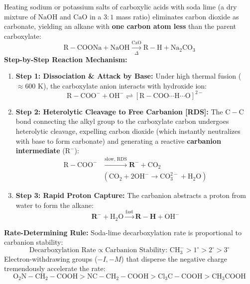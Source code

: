 \documentclass[10pt,twoside,openright]{book}
\begin{document}
\begin{conceptbox}
Heating sodium or potassium salts of carboxylic acids with soda lime (a dry mixture of $\mathrm{NaOH}$ and $\mathrm{CaO}$ in a $3:1$ mass ratio) eliminates carbon dioxide as carbonate, yielding an alkane with \textbf{one carbon atom less} than the parent carboxylate:
\begin{equation}
  \mathrm{R-COONa} + \mathrm{NaOH} \xrightarrow[\Delta]{\mathrm{CaO}} \mathrm{R-H} + \mathrm{Na_2CO_3}
\end{equation}
\textbf{Step-by-Step Reaction Mechanism:}
\begin{enumerate}[leftmargin=*]
  \item \textbf{Step 1: Dissociation \& Attack by Base:}
  Under high thermal fusion ($\approx 600\text{ K}$), the carboxylate anion interacts with hydroxide ion:
  \begin{equation}
    \mathrm{R-COO^-} + \mathrm{OH^-} \rightleftharpoons [\mathrm{R-COO\cdots H\cdots O}]^{2-}
  \end{equation}
  \item \textbf{Step 2: Heterolytic Cleavage to Free Carbanion [RDS]:}
  The $\mathrm{C-C}$ bond connecting the alkyl group to the carboxylate carbon undergoes heterolytic cleavage, expelling carbon dioxide (which instantly neutralizes with base to form carbonate) and generating a reactive \textbf{carbanion intermediate} ($\mathrm{R^-}$):
  \begin{align*}
    \mathrm{R-COO^-} &\xrightarrow{\text{slow, RDS}} \mathbf{R^-} + \mathrm{CO_2} \\
    &(\mathrm{CO_2} + 2\mathrm{OH^-} \to \mathrm{CO_3^{2-}} + \mathrm{H_2O})
  \end{align*}
  \item \textbf{Step 3: Rapid Proton Capture:}
  The carbanion abstracts a proton from water to form the alkane:
  \begin{equation*}
    \mathbf{R^-} + \mathrm{H_2O} \xrightarrow{\text{fast}} \mathbf{R-H} + \mathrm{OH^-}
  \end{equation*}
\end{enumerate}
\textbf{Rate-Determining Rule:} Soda-lime decarboxylation rate is proportional to carbanion stability:
\begin{equation*}
  \text{Decarboxylation Rate} \propto \text{Carbanion Stability: } \mathrm{CH_3^-} > 1^\circ > 2^\circ > 3^\circ
\end{equation*}
Electron-withdrawing groups ($-I, -M$) that disperse the negative charge tremendously accelerate the rate:
\begin{equation}
  \mathrm{O_2N-CH_2-COOH} > \mathrm{NC-CH_2-COOH} > \mathrm{Cl_3C-COOH} > \mathrm{CH_3COOH}
\end{equation}
\end{conceptbox}
\end{document}
